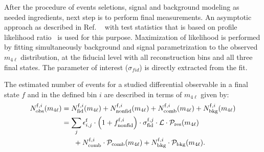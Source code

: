 After the procedure of events seletions, signal and background modeling as needed ingredients, next step is to perform final measurements. An asymptotic approach as described in Ref. ~\cite{Cowan:2010js} with test statistics that is based on profile likelihood ratio~\cite{LHC-HCG} is used for this purpose. Maximization of likelihood is performed by fitting simultaneously background and                            
signal
parametrization to the observed $m_{4\ell}$ distribution, at the fiducial level with all reconstruction bins and all three final states. 
The parameter of interest ($\sigma{}_{fid}$) is directly extracted from the fit. 


\par The estimated number of events for a studied differential observable in a final state $f$ and in the defined bin $i$ are described in terms of $m_{4\ell}$ given by:
\begin{eqnarray}
\label{eqn:m4l}
\begin{aligned}
N_{\mathrm{obs}}^{\mathrm{f},i}(m_{4\ell}) &= N_{\mathrm{fid}}^{\mathrm{f},i}(m_{4\ell})+N_{\mathrm{nonfid}}^{\mathrm{f},i}(m_{4\ell})+N_{\mathrm{comb}}^{\mathrm{f},i}(m_{4\ell})+N_{\mathrm{bkg}}^{\mathrm{f},i}(m_{4\ell}) \\
&=\sum_{j} \epsilon_{i,j}^{\mathrm{f}} \cdot \left(1+f_{\rm nonfid}^{\mathrm{f},i} \right)\cdot\sigma_{\mathrm{fid}}^{\mathrm{f},j} \cdot \mathcal{L}\cdot\mathcal{P}_{\mathrm{res}}(m_{4\ell}) \\
&~~~~~+ N_{\mathrm{comb}}^{\mathrm{f},i}\cdot\mathcal{P}_{\mathrm{comb}}(m_{4\ell})+N_{\mathrm{bkg}}^{\mathrm{f},i}\cdot\mathcal{P}_{\mathrm{bkg}}(m_{4\ell}).
\end{aligned}
\end{eqnarray}


